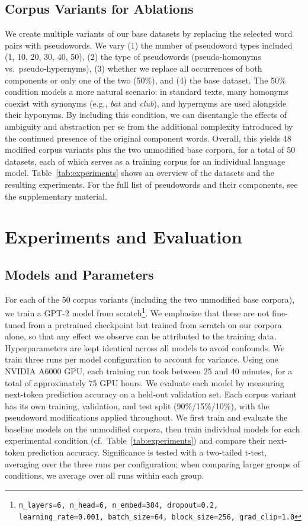 \documentclass[final]{clv2025}
\begin{document}
\subsection{Corpus Variants for Ablations}\label{sec:variants}
We create multiple variants of our base datasets by replacing the selected word pairs with pseudowords. We vary (1) the number of pseudoword types included (1, 10, 20, 30, 40, 50), (2) the type of pseudowords (pseudo-homonyms vs.\ pseudo-hypernyms), (3) whether we replace all occurrences of both components or only one of the two (50\%), and (4) the base dataset. The 50\% condition models a more natural scenario: in standard texts, many homonyms coexist with synonyms (e.g., \emph{bat} and \emph{club}), and hypernyms are used alongside their hyponyms. By including this condition, we can disentangle the effects of ambiguity and abstraction per se from the additional complexity introduced by the continued presence of the original component words. Overall, this yields 48 modified corpus variants plus the two unmodified base corpora, for a total of 50 datasets, each of which serves as a training corpus for an individual language model. Table~\ref{tab:experiments} shows an overview of the datasets and the resulting experiments. For the full list of pseudowords and their components, see the supplementary material.


\section{Experiments and Evaluation}\label{sec:experiments}
\subsection{Models and Parameters}
For each of the 50 corpus variants (including the two unmodified base corpora), we train a GPT-2 model from scratch\footnote{\texttt{n\_layers=6, n\_head=6, n\_embed=384, dropout=0.2, learning\_rate=0.001, batch\_size=64, block\_size=256, grad\_clip=1.0}}. We emphasize that these are not fine-tuned from a pretrained checkpoint but trained from scratch on our corpora alone, so that any effect we observe can be attributed to the training data. Hyperparameters are kept identical across all models to avoid confounds. We train three runs per model configuration to account for variance. Using one NVIDIA A6000 GPU, each training run took between 25 and 40 minutes, for a total of approximately 75 GPU hours.
We evaluate each model by measuring next-token prediction accuracy on a held-out validation set. Each corpus variant has its own training, validation, and test split 
(90\%/15\%/10\%), with the pseudoword modifications applied throughout. We first train and evaluate the baseline models on the unmodified corpora, then train individual models for each experimental condition (cf.\ Table~\ref{tab:experiments}) and compare their next-token prediction accuracy. Significance is tested with a two-tailed t-test, averaging over the three runs per configuration; when comparing larger groups of conditions, we average over all runs within each group.
\end{document}
